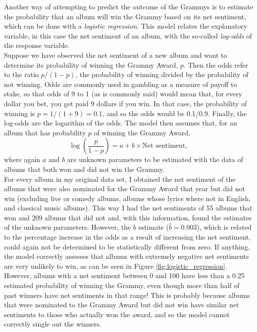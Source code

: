 \documentclass{article}
\begin{document}
\FloatBarrier

Another way of attempting to predict the outcome of the Grammys is to estimate the probability that an album will win the Grammy based on its net sentiment, which can be done with a \textit{logistic regression}. This model relates the explanatory variable, in this case the net sentiment of an album, with the so-called \textit{log-odds} of the response variable. \\



Suppose we have observed the net sentiment of a new album and want to determine its probability of winning the Grammy Award, $p$. Then the odds refer to the ratio $p / (1-p)$, the probability of winning divided by the probability of not winning. Odds are commonly used in gambling as a measure of payoff to stake, so that odds of 9 to 1 (as is commonly said) would mean that, for every dollar you bet, you get paid 9 dollars if you win. In that case, the probability of winning is $p=1/(1+9) = 0.1$, and so the odds would be 0.1/0.9. Finally, the log-odds are the logarithm of the odds. The model then assumes that, for an album that has probability $p$ of winning the Grammy Award,
\begin{equation*}
    \log \left( \frac{p}{1-p} \right) = a + b \times \text{Net sentiment},
\end{equation*}
where again $a$ and $b$ are unknown parameters to be estimated with the data of albums that both won and did not win the Grammy. \\



For every album in my original data set, I obtained the net sentiment of the albums that were also nominated for the Grammy Award that year but did not win (excluding live or comedy albums, albums whose lyrics where not in English, and classical music albums). This way I had the net sentiments of 55 albums that won and 209 albums that did not and, with this information, found the estimates of the unknown parameters. However, the $b$ estimate ($\hat{b}= 0.003$), which is related to the percentage increase in the odds as a result of increasing the net sentiment, could again not be determined to be statistically different from zero. If anything, the model correctly assesses that albums with extremely negative net sentiments are very unlikely to win, as can be seen in Figure \ref{fig:logistic_regression}. However, albums with a net sentiment between 0 and 100 have less than a 0.25 estimated probability of winning the Grammy, even though more than half of past winners have net sentiments in that range! This is probably because albums that were nominated to the Grammy Award but did not win have similar net sentiments to those who actually won the award, and so the model cannot correctly single out the winners.
\end{document}
